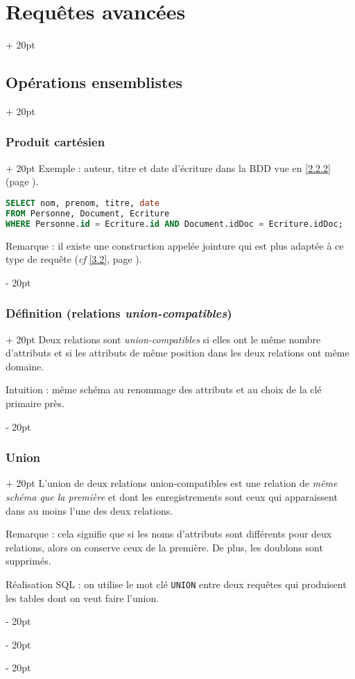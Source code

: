 \documentclass[a4paper, 12pt, twoside]{article}
\newcommand{\ind}[1][20pt]{\advance\leftskip + #1}
\newcommand{\deind}[1][20pt]{\advance\leftskip - #1}
\newenvironment{indt}[2][20pt]{#2 \par \ind[#1]}{\par \deind} %
\begin{document}
\begin{indt}{\section{Requêtes avancées}}
\begin{indt}{\subsection{Opérations ensemblistes}}
\begin{indt}{\subsubsection{Produit cartésien}}
                Exemple : auteur, titre et date d'écriture dans la BDD vue en \ref{2.2.2} (page \pageref{2.2.2}).

                \begin{lstlisting}[language=SQL, xleftmargin=80pt]
SELECT nom, prenom, titre, date
FROM Personne, Document, Ecriture
WHERE Personne.id = Ecriture.id AND Document.idDoc = Ecriture.idDoc;\end{lstlisting}

                Remarque : il existe une construction appelée jointure qui est plus adaptée à ce type de requête (\textit{cf} \ref{3.2}, page \pageref{3.2}).
            \end{indt}

            \vspace{12pt}
            
            \begin{indt}{\subsubsection{Définition (relations \textit{union-compatibles})}}
                Deux relations sont \textit{union-compatibles} si elles ont le même nombre d'attributs et si les attributs de même position dans les deux relations ont même domaine.

                Intuition : même schéma au renommage des attributs et au choix de la clé primaire près.
            \end{indt}

            \vspace{12pt}
            
            \begin{indt}{\subsubsection{Union}}
                L'union de deux relations union-compatibles est une relation de \textit{même schéma que la première} et dont les enregistrements sont ceux qui apparaissent dans au moins l'une des deux relations.

                Remarque : cela signifie que si les noms d'attributs sont différents pour deux relations, alors on conserve ceux de la première. De plus, les doublons sont supprimés.

                Réalisation SQL : on utilise le mot clé \texttt{UNION} entre deux requêtes qui produisent les tables dont on veut faire l'union.


\end{indt}
\end{indt}
\end{indt}
\end{document}
